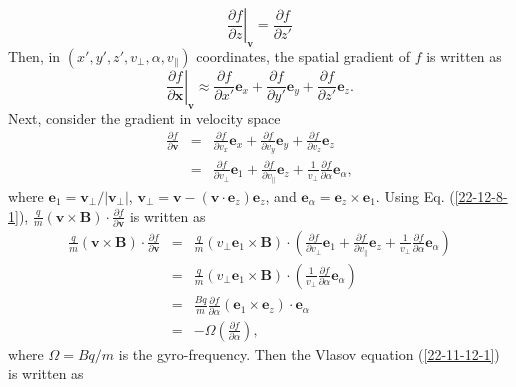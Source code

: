 \documentclass{article}
\begin{document}
\begin{equation}
  \left. \frac{\partial f}{\partial z} \right|_{\mathbf{v}} = \frac{\partial
  f}{\partial z'}
\end{equation}
Then, in $(x', y', z', v_{\perp}, \alpha, v_{\parallel})$ coordinates, the
spatial gradient of $f$ is written as
\begin{equation}
  \left. \frac{\partial f}{\partial \mathbf{x}} \right|_{\mathbf{v}} \approx
  \frac{\partial f}{\partial x'} \mathbf{e}_x + \frac{\partial f}{\partial y'}
  \mathbf{e}_y + \frac{\partial f}{\partial z'} \mathbf{e}_z .
\end{equation}
Next, consider the gradient in velocity space
\begin{eqnarray}
  \frac{\partial f}{\partial \mathbf{v}} & = & \frac{\partial f}{\partial v_x}
  \mathbf{e}_x + \frac{\partial f}{\partial v_y} \mathbf{e}_y + \frac{\partial
  f}{\partial v_z} \mathbf{e}_z \nonumber\\
  & = & \frac{\partial f}{\partial v_{\perp}} \mathbf{e}_1 + \frac{\partial
  f}{\partial v_{\parallel}} \mathbf{e}_z + \frac{1}{v_{\perp}} \frac{\partial
  f}{\partial \alpha} \mathbf{e}_{\alpha},  \label{22-12-8-1}
\end{eqnarray}
where $\mathbf{e}_1 =\mathbf{v}_{\perp} / | \mathbf{v}_{\perp} |$,
$\mathbf{v}_{\perp} =\mathbf{v}- (\mathbf{v} \cdot \mathbf{e}_z)
\mathbf{e}_z$, and $\mathbf{e}_{\alpha} =\mathbf{e}_z \times \mathbf{e}_1$.
Using Eq. (\ref{22-12-8-1}), $\frac{q}{m} (\mathbf{v} \times \mathbf{B}) \cdot
\frac{\partial f}{\partial \mathbf{v}}$ is written as
\begin{eqnarray}
  \frac{q}{m} (\mathbf{v} \times \mathbf{B}) \cdot \frac{\partial f}{\partial
  \mathbf{v}} & = & \frac{q}{m} (v_{\perp} \mathbf{e}_1 \times \mathbf{B})
  \cdot \left( \frac{\partial f}{\partial v_{\perp}} \mathbf{e}_1 +
  \frac{\partial f}{\partial v_{\parallel}} \mathbf{e}_z + \frac{1}{v_{\perp}}
  \frac{\partial f}{\partial \alpha} \mathbf{e}_{\alpha} \right) \nonumber\\
  & = & \frac{q}{m} (v_{\perp} \mathbf{e}_1 \times \mathbf{B}) \cdot \left(
  \frac{1}{v_{\perp}} \frac{\partial f}{\partial \alpha} \mathbf{e}_{\alpha}
  \right) \nonumber\\
  & = & \frac{B q}{m}  \frac{\partial f}{\partial \alpha}  (\mathbf{e}_1
  \times \mathbf{e}_z) \cdot \mathbf{e}_{\alpha} \nonumber\\
  & = & - \Omega \left( \frac{\partial f}{\partial \alpha} \right), 
\end{eqnarray}
where $\Omega = B q / m$ is the gyro-frequency. Then the Vlasov equation
(\ref{22-11-12-1}) is written as
\end{document}
